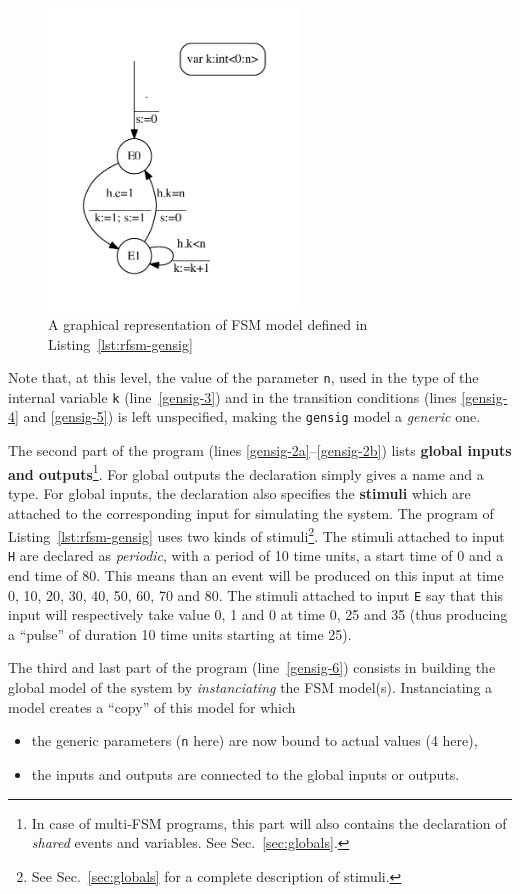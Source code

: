 \begin{figure}[!h]
   \includegraphics[height=8cm]{figs/gensig-model}
   \centering
  \caption{A graphical representation of FSM model defined in Listing~\ref{lst:rfsm-gensig}}
  \label{fig:rfsm-gensig-model}
\end{figure}

Note that, at this level, the value of the parameter \verb|n|, used in the type of the internal
variable \verb|k| (line~\ref{gensig-3}) and in the transition conditions (lines \ref{gensig-4} and
\ref{gensig-5}) is left unspecified, making the \verb|gensig| model a \emph{generic} one.

\medskip The second part of the program (lines \ref{gensig-2a}--\ref{gensig-2b}) lists \textbf{global inputs and
  outputs}\footnote{In case of multi-FSM programs, this part will also contains the declaration of
  \emph{shared} events and variables. See Sec.~\ref{sec:globals}.}.  For global outputs the
declaration simply gives a name and a type.  For global inputs, the declaration also specifies the
\textbf{stimuli} which are attached to the corresponding input for simulating the system. The
program of Listing~\ref{lst:rfsm-gensig} uses two kinds of stimuli\footnote{See
  Sec.~\ref{sec:globals} for a complete description of stimuli.}. The stimuli attached to input
\verb|H| are declared as \emph{periodic}, with a period of 10 time units, a start time of 0 and a
end time of 80. This means than an event will be produced on this input at time 0, 10, 20, 30, 40,
50, 60, 70 and 80. The stimuli attached to input \verb|E| say that this input will respectively take
value 0, 1 and 0 at time 0, 25 and 35 (thus producing a ``pulse'' of duration 10 time units starting
at time 25).

\medskip
The third and last part of the program (line~\ref{gensig-6}) consists in building the global model of the system by
\emph{instanciating} the FSM model(s).
Instanciating a model creates a ``copy'' of this model for which
\begin{itemize}
\item the generic parameters (\verb|n| here) are now bound to actual values (4 here),
\item the inputs and outputs are connected to the global inputs or outputs. 
\end{itemize}

